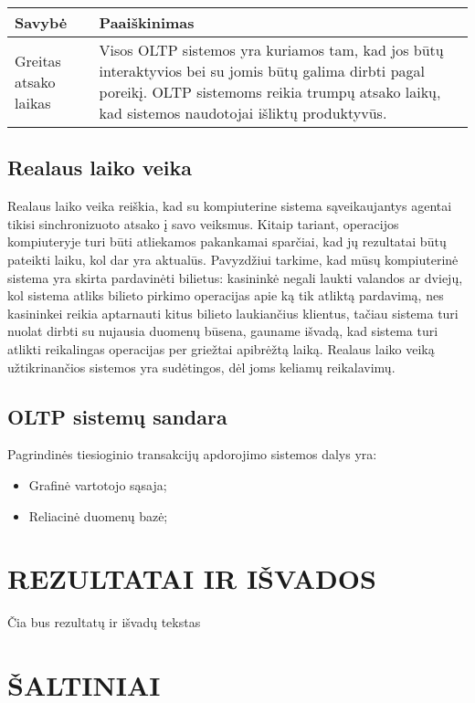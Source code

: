 \documentclass[12pt,a4paper,titlepage]{article}
\begin{document}
\begin{tabular}{|l|p{8cm}|}
\hline 
\textbf{Savybė} & \textbf{Paaiškinimas} \\ 
\hline 
Greitas atsako laikas & Visos OLTP sistemos yra kuriamos tam, kad jos būtų interaktyvios bei su jomis būtų galima dirbti pagal poreikį. OLTP sistemoms reikia trumpų atsako laikų, kad sistemos naudotojai išliktų produktyvūs. \\ 
\hline
\end{tabular}

\subsection{Realaus laiko veika}
Realaus laiko veika reiškia, kad su kompiuterine sistema sąveikaujantys agentai tikisi sinchronizuoto atsako į savo veiksmus. Kitaip tariant, operacijos kompiuteryje turi būti atliekamos pakankamai sparčiai, kad jų rezultatai būtų pateikti laiku, kol dar yra aktualūs. Pavyzdžiui tarkime, kad mūsų kompiuterinė sistema yra skirta pardavinėti bilietus: kasininkė negali laukti valandos ar dviejų, kol sistema atliks bilieto pirkimo operacijas apie ką tik atliktą pardavimą, nes kasininkei reikia aptarnauti kitus bilieto laukiančius klientus, tačiau sistema turi nuolat dirbti su nujausia duomenų būsena, gauname išvadą, kad sistema turi atlikti reikalingas operacijas per griežtai apibrėžtą laiką. Realaus laiko veiką užtikrinančios sistemos yra sudėtingos, dėl joms keliamų reikalavimų.

\subsection{OLTP sistemų sandara}
Pagrindinės tiesioginio transakcijų apdorojimo sistemos dalys yra:
\begin{itemize}
	\item Grafinė vartotojo sąsaja;
	\item Reliacinė duomenų bazė;
\end{itemize}

\section*{REZULTATAI IR IŠVADOS}
Čia bus rezultatų ir išvadų tekstas

\section*{ŠALTINIAI}
\end{document}
